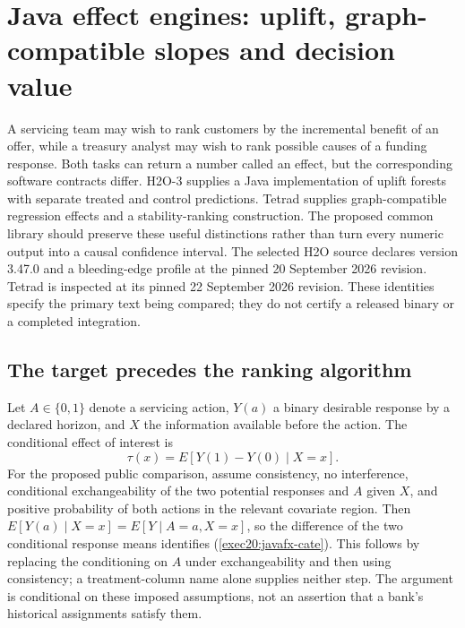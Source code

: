 \section{Java effect engines: uplift, graph-compatible slopes and decision value}
\label{exec20:javafx-scope}

A servicing team may wish to rank customers by the incremental benefit of an
offer, while a treasury analyst may wish to rank possible causes of a funding
response. Both tasks can return a number called an effect, but the corresponding
software contracts differ. H2O-3 supplies a Java implementation of uplift
forests with separate treated and control predictions. Tetrad supplies
graph-compatible regression effects and a stability-ranking construction.
The proposed common library should preserve these useful distinctions rather
than turn every numeric output into a causal confidence interval. The selected
H2O source declares version 3.47.0 and a bleeding-edge profile at the pinned
20 September 2026 revision. Tetrad is inspected at its pinned 22 September 2026
revision. These identities specify the primary text being compared; they do
not certify a released binary or a completed integration.
\citep{exec20_javaeffects_h2o,exec20_javaeffects_tetrad}

\subsection{The target precedes the ranking algorithm}
\label{exec20:javafx-target}

Let $A\in\{0,1\}$ denote a servicing action, $Y(a)$ a binary desirable
response by a declared horizon, and $X$ the information available before the
action. The conditional effect of interest is
\begin{equation}
 \tau(x)=E[Y(1)-Y(0)\mid X=x].
 \label{exec20:javafx-cate}
\end{equation}
For the proposed public comparison, assume consistency, no interference,
conditional exchangeability of the two potential responses and $A$ given $X$,
and positive probability of both actions in the relevant covariate region.
Then $E[Y(a)\mid X=x]=E[Y\mid A=a,X=x]$, so the difference of the
two conditional response means identifies (\ref{exec20:javafx-cate}). This
follows by replacing the conditioning on $A$ under exchangeability and then
using consistency; a treatment-column name alone supplies neither step.
The argument is conditional on these imposed assumptions, not an assertion
that a bank's historical assignments satisfy them.
\citep{exec20_javaeffects_reference}

